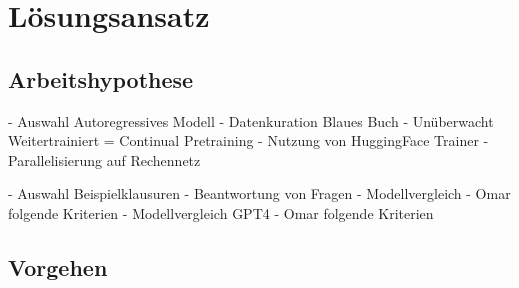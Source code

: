 \chapter{Lösungsansatz}\label{ch:approach}
\section*{Arbeitshypothese}
- Auswahl Autoregressives Modell
- Datenkuration Blaues Buch
- Unüberwacht Weitertrainiert = Continual Pretraining
    - Nutzung von HuggingFace Trainer
    - Parallelisierung auf Rechennetz

- Auswahl Beispielklausuren
- Beantwortung von Fragen
- Modellvergleich
    - Omar folgende Kriterien
- Modellvergleich GPT4
    - Omar folgende Kriterien

\section*{Vorgehen}
